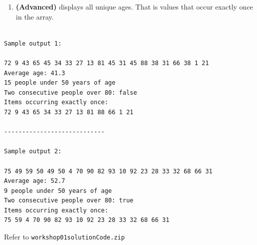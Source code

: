 \begin{questions}
\begin{enumerate}
\item \textbf{(Advanced)} displays all unique ages. That is values that occur exactly once in the array.
\end{enumerate}

\begin{verbatim}

Sample output 1:

72 9 43 65 45 34 33 27 13 81 45 31 45 88 38 31 66 38 1 21 
Average age: 41.3
15 people under 50 years of age
Two consecutive people over 80: false
Items occurring exactly once:
72 9 43 65 34 33 27 13 81 88 66 1 21 

----------------------------

Sample output 2:

75 49 59 50 49 50 4 70 90 82 93 10 92 23 28 33 32 68 66 31 
Average age: 52.7
9 people under 50 years of age
Two consecutive people over 80: true
Items occurring exactly once:
75 59 4 70 90 82 93 10 92 23 28 33 32 68 66 31 

\end{verbatim}

\begin{solution}
Refer to \texttt{workshop01solutionCode.zip}	
\end{solution}
\end{questions}


